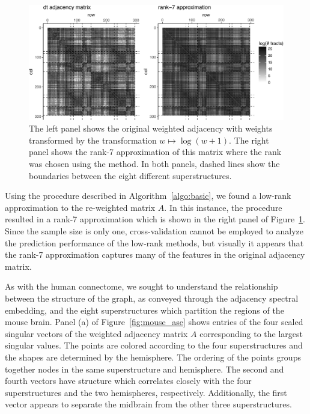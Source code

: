 \documentclass[journal,twoside,web]{ieeecolor}
\begin{document}
\begin{figure}[tbh!]
	\centering
	\includegraphics[width=\linewidth]{mouse_adj_v_Phat.pdf}
	\caption{The left panel shows the original weighted adjacency with weights transformed by the transformation $w\mapsto \log(w+1)$. 
	The right panel shows the rank-7 approximation of this matrix where the rank was chosen using the \cite{zhu2006automatic} method.
	In both panels, dashed lines show the boundaries between the eight different superstructures. }
	\label{fig:mouse_adj_lr}
\end{figure}

Using the procedure described in Algorithm~\ref{algo:basic}, we found a low-rank approximation to the re-weighted matrix $A$.
In this instance, the \cite{zhu2006automatic} procedure resulted in a rank-7 approximation which is shown in the right panel of Figure~\ref{fig:mouse_adj_lr}.
Since the sample size is only one, cross-validation cannot be employed to analyze the prediction performance of the low-rank methods, but visually it appears that the rank-7 approximation captures many of the features in the original adjacency matrix.

As with the human connectome, we sought to understand the relationship between the structure of the graph, as conveyed through the adjacency spectral embedding, and the eight superstructures which partition the regions of the mouse brain.
Panel (a) of Figure~\ref{fig:mouse_ase} shows entries of the four scaled singular vectors  of the weighted adjacency matrix $A$ corresponding to the largest singular values. 
The points are colored according to the four superstructures and the shapes are determined by the hemisphere. 
The ordering of the points groups together nodes in the same superstructure and hemisphere. The second and fourth vectors have structure which correlates closely with the four superstructures and the two hemispheres, respectively.
Additionally, the first vector appears to separate the midbrain from the other three superstructures.
\end{document}
